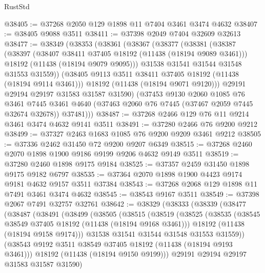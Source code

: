\begin{lexlean}{RustStd}
\begin{coremodule}
@38405 := @37268 @2050 @129 @1898 @11 @7404 @3461 @3474 @4632
@38407 := @38405 @9088 @3511
@38411 := @37398 @2049 @7404 @32609 @32613
@38477 := @38349
    (@38353
      (@38361
        (@38367
          (@38377
            (@38381
              (@38387
                (@38397
                  (@38407 @38411 @37405 @18192 (@11438 (@18194 @9089 @3461)))
                  @18192
                  (@11438 (@18194 @9079 @9095)))
                @31538
                @31541
                @31544
                @31548
                @31553
                @31559))
            (@38405 @9113 @3511 @38411 @37405 @18192 (@11438 (@18194 @9114 @3461)))
            @18192
            (@11438 (@18194 @9071 @9120)))
          @29191
          @29194
          @29197
          @31583
          @31587
          @31590)
        (@37453
          @9130
          @2060
          @1085
          @76
          @3461
          @7445
          @3461
          @4640
          (@37463 @2060 @76 @7445 (@37467 @2059 @7445 @32674 @32678))
          @37481)))
@38487 := @37268 @2466 @129 @76 @11 @9214 @3461 @3474 @4632 @9141 @3511
@38491 := @37280 @2466 @76 @9200 @9212
@38499 := @37327 @2463 @1683 @1085 @76 @9200 @9209 @3461 @9212
@38505 := @37336 @2462 @31450 @72 @9200 @9207 @6349
@38515 := @37268 @2460 @2070 @1898 @1900 @9186 @9199 @9206 @4632 @9149 @3511
@38519 := @37280 @2460 @1898 @9175 @9184
@38525 := @37357 @2459 @31450 @1898 @9175 @9182 @6797
@38535 := @37364 @2070 @1898 @1900 @4423 @9174 @9181 @4632 @9157 @3511 @37384
@38543 := @37268 @2068 @129 @1898 @11 @7491 @3461 @3474 @4632
@38545 := @38543 @9167 @3511
@38549 := @37398 @2067 @7491 @32757 @32761
@38642 := @38329
    (@38333
      (@38339
        (@38477
          (@38487
            (@38491
              (@38499
                (@38505
                  (@38515
                    (@38519
                      (@38525
                        (@38535
                          (@38545 @38549 @37405 @18192 (@11438 (@18194 @9168 @3461)))
                          @18192
                          (@11438 (@18194 @9158 @9174)))
                        @31538
                        @31541
                        @31544
                        @31548
                        @31553
                        @31559))
                    (@38543 @9192 @3511 @38549 @37405 @18192 (@11438 (@18194 @9193 @3461)))
                    @18192
                    (@11438 (@18194 @9150 @9199)))
                  @29191
                  @29194
                  @29197
                  @31583
                  @31587
                  @31590)

\end{coremodule}
\end{lexlean}
